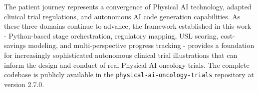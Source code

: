 The patient journey represents a convergence of Physical AI technology, adapted clinical trial regulations, and autonomous AI code generation capabilities. As these three domains continue to advance, the framework established in this work - Python-based stage orchestration, regulatory mapping, USL scoring, cost-savings modeling, and multi-perspective progress tracking - provides a foundation for increasingly sophisticated autonomous clinical trial illustrations that can inform the design and conduct of real Physical AI oncology trials. The complete codebase is publicly available in the \texttt{physical-ai-oncology-trials} repository at version 2.7.0.


